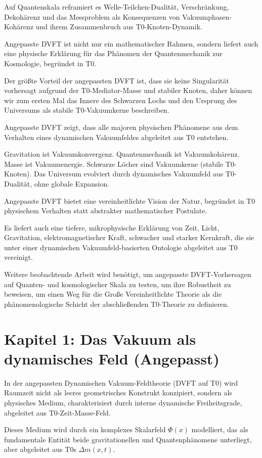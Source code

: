 \documentclass[12pt,a4paper]{article}
\begin{document}
	Auf Quantenskala reframiert es Welle-Teilchen-Dualität, Verschränkung, Dekohärenz und das Messproblem als Konsequenzen von Vakuumphasen-Kohärenz und ihrem Zusammenbruch aus T0-Knoten-Dynamik.
	
	Angepasste DVFT ist nicht nur ein mathematischer Rahmen, sondern liefert auch eine physische Erklärung für das Phänomen der Quantenmechanik zur Kosmologie, begründet in T0.
	
	Der größte Vorteil der angepassten DVFT ist, dass sie keine Singularität vorhersagt aufgrund der T0-Mediator-Masse und stabiler Knoten, daher können wir zum ersten Mal das Innere des Schwarzen Lochs und den Ursprung des Universums als stabile T0-Vakuumkerne beschreiben.
	
	Angepasste DVFT zeigt, dass alle majoren physischen Phänomene aus dem Verhalten eines dynamischen Vakuumfeldes abgeleitet aus T0 entstehen.
	
	Gravitation ist Vakuumkonvergenz.
	Quantenmechanik ist Vakuumkohärenz.
	Masse ist Vakuumenergie.
	Schwarze Löcher sind Vakuumkerne (stabile T0-Knoten).
	Das Universum evolviert durch dynamisches Vakuumfeld aus T0-Dualität, ohne globale Expansion.
	
	Angepasste DVFT bietet eine vereinheitlichte Vision der Natur, begründet in T0 physischem Verhalten statt abstrakter mathematischer Postulate.
	
	Es liefert auch eine tiefere, mikrophysische Erklärung von Zeit, Licht, Gravitation, elektromagnetischer Kraft, schwacher und starker Kernkraft, die sie unter einer dynamischen Vakuumfeld-basierten Ontologie abgeleitet aus T0 vereinigt.
	
	Weitere beobachtende Arbeit wird benötigt, um angepasste DVFT-Vorhersagen auf Quanten- und kosmologischer Skala zu testen, um ihre Robustheit zu beweisen, um einen Weg für die Große Vereinheitlichte Theorie als die phänomenologische Schicht der abschließenden T0-Theorie zu definieren.
	
	\section{Kapitel 1: Das Vakuum als dynamisches Feld (Angepasst)}
	
	In der angepassten Dynamischen Vakuum-Feldtheorie (DVFT auf T0) wird Raumzeit nicht als leeres geometrisches Konstrukt konzipiert, sondern als physisches Medium, charakterisiert durch interne dynamische Freiheitsgrade, abgeleitet aus T0-Zeit-Masse-Feld.
	
	Dieses Medium wird durch ein komplexes Skalarfeld $\Phi(x)$ modelliert, das als fundamentale Entität beide gravitationellen und Quantenphänomene unterliegt, aber abgeleitet aus T0s $\Delta m(x,t)$.
	
\end{document}

